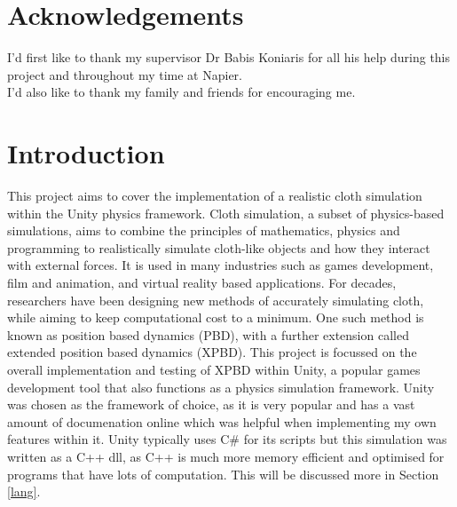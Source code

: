 \documentclass[12pt,a4paper]{article}
\begin{document}
\section*{Acknowledgements}
I'd first like to thank my supervisor Dr Babis Koniaris for all his help during this project and throughout my time at Napier.\\

I'd also like to thank my family and friends for encouraging me.

\newpage

\section{Introduction}
This project aims to cover the implementation of a realistic cloth simulation within the Unity physics framework. Cloth simulation, a subset of physics-based simulations, aims to combine the principles of mathematics, physics and programming to realistically simulate cloth-like objects and how they interact with external forces. It is used in many industries such as games development, film and animation, and virtual reality based applications. For decades, researchers have been designing new methods of accurately simulating cloth, while aiming to keep computational cost to a minimum. One such method is known as position based dynamics (PBD), with a further extension called extended position based dynamics (XPBD). This project is focussed on the overall implementation and testing of XPBD within Unity, a popular games development tool that also functions as a physics simulation framework. Unity was chosen as the framework of choice, as it is very popular and has a vast amount of documenation online which was helpful when implementing my own features within it. Unity typically uses C\# for its scripts but this simulation was written as a C++ dll, as C++ is much more memory efficient and optimised for programs that have lots of computation. This will be discussed more in Section \ref{lang}.  \\
\end{document}
